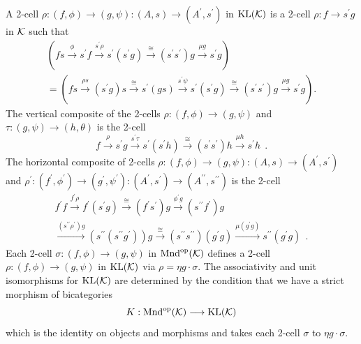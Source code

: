 \documentclass[a4paper,10pt]{article}
\newcommand{\bk}{{\cal{K}}}
\numberwithin{equation}{section}
\begin{document}
A 2-cell $\rho : (f, \phi)\longrightarrow (g, \psi) : (A,s) \longrightarrow (A^{\prime},s^{\prime})$ in $\mathrm{KL}(\bk)$ is a 2-cell $\rho : f \longrightarrow s^{\prime} g$ in $\bk$ such that  
\begin{multline}\label{KL2cell}
\left( f s\overset{\phi }{\longrightarrow }s^{\prime }f \overset{s^{\prime
}\rho }{\longrightarrow }s^{\prime }( s^{\prime } g) \overset{\cong
}{\longrightarrow }\left( s^{\prime } s^{\prime }\right) g\overset{\mu
g}{\longrightarrow }s^{\prime }g\right) \\
=\left( f s\overset{\rho  s}{\longrightarrow }\left( s^{\prime }
g\right) s\overset{\cong }{\longrightarrow }s^{\prime } \left( g
s\right) \overset{s^{\prime } \psi }{\longrightarrow }s^{\prime
} \left( s^{\prime } g\right) \overset{\cong }{\longrightarrow }\left(
s^{\prime } s^{\prime }\right)  g\overset{\mu  g}{\longrightarrow
}s^{\prime } g\right) .
\end{multline}
\noindent The vertical composite of the 2-cells $\rho:(f,\phi) \longrightarrow (g,\psi)$ and $\tau:(g,\psi)\longrightarrow (h,\theta)$ is the 2-cell
\begin{equation}
f\overset{\rho }{\longrightarrow }s^{\prime }g\overset{s^{\prime
}\tau }{\longrightarrow }s^{\prime }( s^{\prime }h) \overset{\cong
}{\longrightarrow }\left( s^{\prime }s^{\prime }\right) h\overset{\mu
h}{\longrightarrow }s^{\prime }h\ \ .
\end{equation}
\noindent The horizontal composite of 2-cells $\rho : (f, \phi)\longrightarrow (g, \psi) : (A,s) \longrightarrow (A^{\prime},s^{\prime})$ and $\rho^{\prime} : (f^{\prime}, \phi^{\prime})\longrightarrow (g^{\prime}, \psi^{\prime}) : (A^{\prime},s^{\prime}) \longrightarrow (A^{\prime \prime},s^{\prime \prime})$ is the 2-cell
\begin{multline}
f^{\prime }f\overset{f^{\prime }\rho }{\longrightarrow }f^{\prime
}( s^{\prime }g) \overset{\cong }{\longrightarrow } \left( f^{\prime
}s^{\prime }\right) g\overset{\phi ^{\prime }g}{\longrightarrow
}\left( s^{{\prime\prime}}f^{\prime }\right) g\\
\overset{\left( s^{{\prime\prime}}\rho ^{\prime }\right) g}{\longrightarrow
}\left( s^{{\prime\prime}}( s^{{\prime\prime}}g^{\prime }) \right)
g\overset{\cong }{\longrightarrow }\left( s^{{\prime\prime}}s^{{\prime\prime}}\right)
\left( g^{\prime }g\right) \overset{\mu  \left( g^{\prime }g\right)
}{\longrightarrow }s^{{\prime\prime}}( g^{\prime }g) \ \ .
\end{multline}
\noindent Each 2-cell $\sigma :(f,\phi) \longrightarrow (g,\psi)$ 
in $\mathrm{Mnd}^{\mathrm{op}}(\bk)$ defines a 2-cell 
$\rho : (f, \phi) \longrightarrow (g, \psi)$ 
in $\mathrm{KL}(\bk)$ via $\rho = \eta g \cdot \sigma$.
The associativity and unit isomorphisms for $\mathrm{KL}(\bk)$ are
determined by the condition that we have a strict morphism of bicategories 
$$K: \mathrm{Mnd}^{\mathrm{op}}(\bk) \longrightarrow \mathrm{KL}(\bk)$$
which is the identity on objects and morphisms and takes each 2-cell $\sigma$
to $\eta g \cdot \sigma$. 
\end{document}

